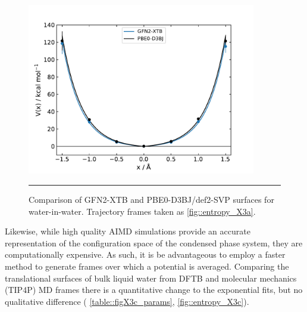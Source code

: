 \documentclass[../main.tex]{subfiles}
\begin{document}
\begin{figure}[h!]
	\centering
	\includegraphics[width=10cm]{4/figs/figX3/dft_vs_xtb_well.pdf}
	\vspace{0.2cm}
	\hrule
	\caption{Comparison of GFN2-XTB and PBE0-D3BJ/def2-SVP surfaces for water-in-water. Trajectory frames taken as \figurename{ \ref{fig::entropy_X3a}}.}
	\label{fig::entropy_X3b}
\end{figure}

Likewise, while high quality AIMD simulations provide an accurate representation of the configuration space of the condensed phase system, they are computationally expensive. As such, it is be advantageous to employ a faster method to generate frames over which a potential is averaged. Comparing the translational surfaces of bulk liquid water from DFTB and molecular mechanics (TIP4P) MD frames there is a quantitative change to the exponential fits, but no qualitative difference (\tablename{ \ref{table::figX3c_params}}, \figurename{ \ref{fig::entropy_X3c}}).
\vspace{0.2cm}
\end{document}

